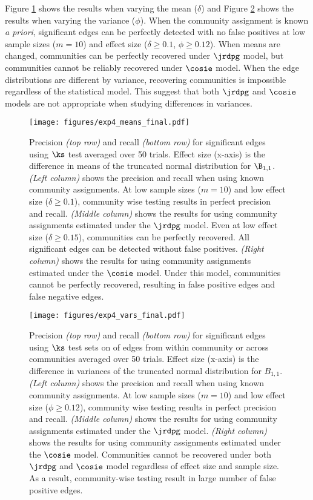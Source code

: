 Figure \ref{fig:exp4_means} shows the results when varying the mean ($\delta$) and Figure \ref{fig:exp4_vars} shows the results when varying the variance ($\phi$). When the community assignment is known \textit{a priori}, significant edges can be perfectly detected with no false positives at low sample sizes ($m=10$) and effect size ($\delta \geq 0.1$, $\phi \geq 0.12$). When means are changed, communities can be perfectly recovered under $\jrdpg$ model, but communities cannot be reliably recovered under $\cosie$ model. When the edge distributions are different by variance, recovering communities is impossible regardless of the statistical model. This suggest that both $\jrdpg$ and $\cosie$ models are not appropriate when studying differences in variances. 

\begin{figure}
    \centering
    \texttt{[image: figures/exp4\_means\_final.pdf]}
    \caption{Precision \textit{(top row)} and recall \textit{(bottom row)} for significant edges using $\ks$ test averaged over 50 trials. Effect size (x-axis) is the difference in means of the truncated normal distribution for $\B_{1, 1}$.
    \textit{(Left column)} shows the precision and recall when using known community assignments. At low sample sizes ($m =10$) and low effect size ($\delta \geq 0.1$), community wise testing results in perfect precision and recall.
    \textit{(Middle column)} shows the results for using community assignments estimated under the $\jrdpg$ model. Even at low effect size ($\delta \geq 0.15$), communities can be perfectly recovered. All significant edges can be detected without false positives. 
    \textit{(Right column)} shows the results for using community assignments estimated under the $\cosie$ model. Under this model, communities cannot be perfectly recovered, resulting in false positive edges and false negative edges.}
    \label{fig:exp4_means}
\end{figure}

\begin{figure}
    \centering
    \texttt{[image: figures/exp4\_vars\_final.pdf]}
    \caption{Precision \textit{(top row)} and recall \textit{(bottom row)} for significant edges using $\ks$ test sets on of edges from within community or across communities averaged over 50 trials. Effect size (x-axis) is the difference in variances of the truncated normal distribution for $B_{1,1}$.
    \textit{(Left column)} shows the precision and recall when using known community assignments. At low sample sizes ($m =10$) and low effect size ($\phi \geq 0.12$), community wise testing results in perfect precision and recall.
    \textit{(Middle column)} shows the results for using community assignments estimated under the $\jrdpg$ model.
    \textit{(Right column)} shows the results for using community assignments estimated under the $\cosie$ model.
    Communities cannot be recovered under both $\jrdpg$ and $\cosie$ model regardless of effect size and sample size. As a result, community-wise testing result in large number of false positive edges.
    }
    \label{fig:exp4_vars}
\end{figure}

